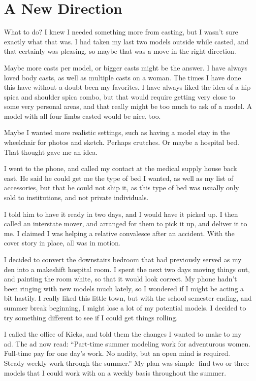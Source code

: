 \chapter{A New Direction}
What to do? I knew I needed something more from casting, but I wasn't sure exactly what that
was. I had taken my last two models outside while casted, and that certainly was pleasing, so
maybe that was a move in the right direction.

Maybe more casts per model, or bigger casts might be the answer. I have always loved body
casts, as well as multiple casts on a woman. The times I have done this have without a doubt
been my favorites. I have always liked the idea of a hip spica and shoulder spica combo, but
that would require getting very close to some very personal areas, and that really might be too
much to ask of a model. A model with all four limbs casted would be nice, too.

Maybe I wanted more realistic settings, such as having a model stay in the wheelchair for
photos and sketch. Perhaps crutches. Or maybe a hospital bed. That thought gave me an idea.

I went to the phone, and called my contact at the medical supply house back east. He said he
could get me the type of bed I wanted, as well as my list of accessories, but that he could not
ship it, as this type of bed was usually only sold to institutions, and not private individuals.

I told him to have it ready in two days, and I would have it picked up. I then called an
interstate mover, and arranged for them to pick it up, and deliver it to me. I claimed I was
helping a relative convalesce after an accident. With the cover story in place, all was in
motion.

I decided to convert the downstairs bedroom that had previously served as my den into a
makeshift hospital room. I spent the next two days moving things out, and painting the room
white, so that it would look correct. My phone hadn't been ringing with new models much lately,
so I wondered if I might be acting a bit hastily. I really liked this little town, but with the
school semester ending, and summer break beginning, I might lose a lot of my potential models. I
decided to try something different to see if I could get things rolling.

I called the office of Kicks, and told them the changes I wanted to make to my ad. The ad
now read: ``Part-time summer modeling work for adventurous women. Full-time pay for one day's
work. No nudity, but an open mind is required. Steady weekly work through the summer.'' My plan
was simple- find two or three models that I could work with on a weekly basis throughout the
summer.

